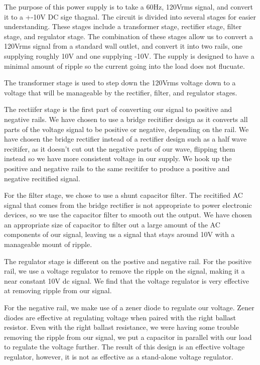 \documentclass[12pt]{article}
\begin{document}
The purpose of this power supply is to take a 60Hz, 120Vrms signal, and convert it to a +-10V DC sige thagnal. The circuit is divided into
several stages for easier understanding. These stages include a transformer stage, rectifier stage, filter stage, and regulator stage. The combination 
of these stages allow us to convert a 120Vrms signal from a standard wall outlet, and convert it into two rails, one supplying roughly 10V and one supplying -10V. 
The supply is designed to have a minimal amount of ripple so the current going into the load does not flucuate.

The transformer stage is used to step down the 120Vrms voltage down to a voltage that will be manageable by the rectifier, filter, and regulator stages.

The rectiifer stage is the first part of converting our signal to positive and negative rails. We have chosen to use a bridge recitifier design as it converts all parts of the voltage signal 
to be positive or negative, depending on the rail. We have chosen the bridge rectifier instead of a rectifier design such as a half wave recitifer, as it doesn't cut out the negative parts of our wave, flipping them instead 
so we have more consistent voltage in our supply. We hook up the positive and negative rails to the same recitifer to produce a positive and negative recitified signal.

For the filter stage, we chose to use a shunt capacitor filter. The recitified AC signal that comes from the bridge rectifier is not appropriate to power electronic devices, so we use the capacitor filter to smooth out the output. We have chosen 
an appropriate size of capacitor to filter out a large amount of the AC components of our signal, leaving us a signal that stays around 10V with a manageable mount of ripple.

The regulator stage is different on the postive and negative rail. For the positive rail, we use a voltage regulator to remove the ripple on the signal, making it a near constant 10V dc signal. We find that the voltage regulator is very effective at removing 
ripple from our signal.

For the negative rail, we make use of a zener diode to regulate our voltage. Zener diodes are effective at regulating voltage when paired with the right ballast resistor. Even with the right ballast resistance, we were having some trouble removing the ripple from our signal, 
we put a capacitor in parallel with our load to regulate the voltage further. The result of this design is an effective voltage regulator, however, it is not as effective as a stand-alone voltage regulator.
\end{document}
